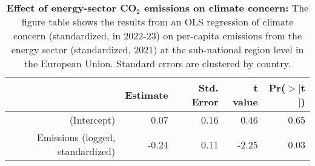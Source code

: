 \begin{table}[ht]
\centering
\begin{tabular}{rrrrr}
  \hline
 & Estimate & Std. Error & t value & Pr($>$$|$t$|$) \\ 
  \hline
(Intercept) & 0.07 & 0.16 & 0.46 & 0.65 \\ 
  Emissions (logged, standardized) & -0.24 & 0.11 & -2.25 & 0.03 \\ 
   \hline
\end{tabular}
\caption{{\bf Effect of energy-sector CO$_2$ emissions on climate concern:} The figure table shows the results from an OLS regression of climate concern (standardized, in 2022-23) on per-capita emissions from the energy sector (standardized, 2021) at the sub-national region level in the European Union. Standard errors are clustered by country.} 
\label{tab:regression.emissions.concern}
\end{table}
